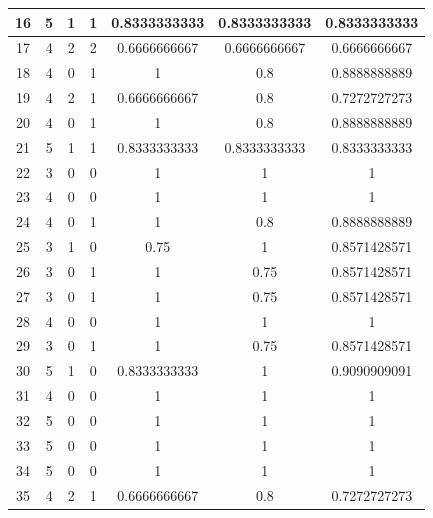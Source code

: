 \begin{table}[h]
\begin{tabular}{|c|c|c|c|c|c|c|}
                       \hline
                        16 & 5 & 1 & 1 & 0.8333333333 & 0.8333333333 & 0.8333333333 \\ 
                       \hline
                        17 & 4 & 2 & 2 & 0.6666666667 & 0.6666666667 & 0.6666666667 \\ 
                       \hline
                        18 & 4 & 0 & 1 & 1 & 0.8 & 0.8888888889 \\ 
                       \hline
                        19 & 4 & 2 & 1 & 0.6666666667 & 0.8 & 0.7272727273 \\ 
                       \hline
                        20 & 4 & 0 & 1 & 1 & 0.8 & 0.8888888889 \\ 
                       \hline
                        21 & 5 & 1 & 1 & 0.8333333333 & 0.8333333333 & 0.8333333333 \\ 
                       \hline
                        22 & 3 & 0 & 0 & 1 & 1 & 1 \\ 
                       \hline
                        23 & 4 & 0 & 0 & 1 & 1 & 1 \\ 
                       \hline
                        24 & 4 & 0 & 1 & 1 & 0.8 & 0.8888888889 \\ 
                       \hline
                        25 & 3 & 1 & 0 & 0.75 & 1 & 0.8571428571 \\ 
                       \hline
                        26 & 3 & 0 & 1 & 1 & 0.75 & 0.8571428571 \\ 
                       \hline
                        27 & 3 & 0 & 1 & 1 & 0.75 & 0.8571428571 \\ 
                       \hline
                        28 & 4 & 0 & 0 & 1 & 1 & 1 \\ 
                       \hline
                        29 & 3 & 0 & 1 & 1 & 0.75 & 0.8571428571 \\ 
                       \hline
                        30 & 5 & 1 & 0 & 0.8333333333 & 1 & 0.9090909091 \\ 
                       \hline
                        31 & 4 & 0 & 0 & 1 & 1 & 1 \\ 
                       \hline
                        32 & 5 & 0 & 0 & 1 & 1 & 1 \\ 
                       \hline
                        33 & 5 & 0 & 0 & 1 & 1 & 1 \\ 
                       \hline
                        34 & 5 & 0 & 0 & 1 & 1 & 1 \\ 
                       \hline
                        35 & 4 & 2 & 1 & 0.6666666667 & 0.8 & 0.7272727273 \\ 
                       \hline
                       
                \end{tabular}
       \end{table} 
